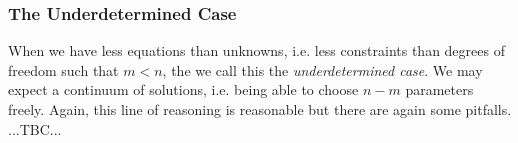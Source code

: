 






\subsubsection{The Underdetermined Case}
When we have less equations than unknowns, i.e. less constraints than degrees of freedom such that $m < n$, the we call this the \emph{underdetermined case}. We may expect a continuum of solutions, i.e. being able to choose $n-m$ parameters freely. Again, this line of reasoning is reasonable but there are again some pitfalls. ...TBC...

